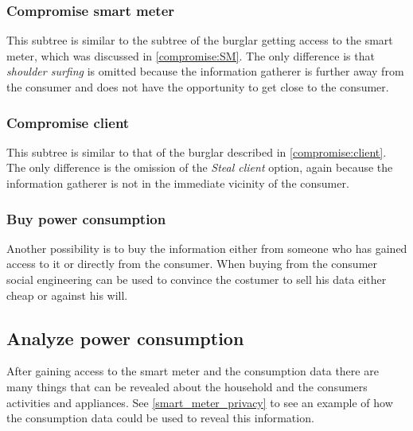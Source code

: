 \subsubsection{Compromise smart meter}
This subtree is similar to the subtree of the burglar getting access to the smart meter, which was discussed in \cref{compromise:SM}.
The only difference is that \emph{shoulder surfing} is omitted because the information gatherer is further away from the consumer and does not have the opportunity to get close to the consumer.

\subsubsection{Compromise client}
This subtree is similar to that of the burglar described in \cref{compromise:client}.
The only difference is the omission of the \emph{Steal client} option, again because the information gatherer is not in the immediate vicinity of the consumer.

\subsubsection{Buy power consumption}
Another possibility is to buy the information either from someone who has gained access to it or directly from the consumer.
When buying from the consumer social engineering can be used to convince the costumer to sell his data either cheap or against his will.

\subsection{Analyze power consumption}
After gaining access to the smart meter and the consumption data there are many things that can be revealed about the household and the consumers activities and appliances.
See \cref{smart_meter_privacy} to see an example of how the consumption data could be used to reveal this information.
